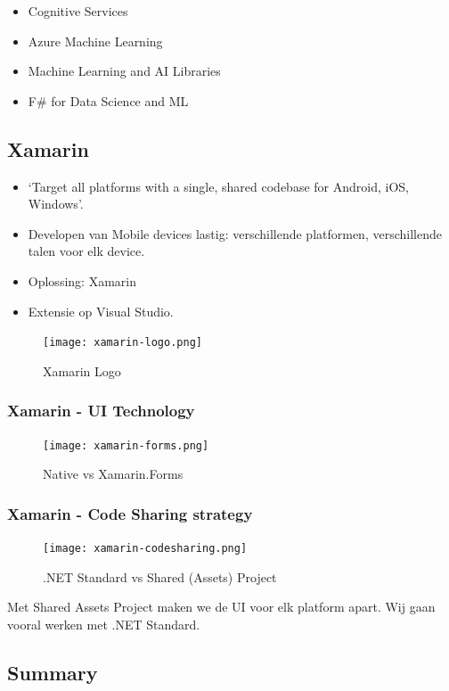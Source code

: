 \documentclass{article}
\begin{document}
\begin{itemize}
    \item Cognitive Services
    \item Azure Machine Learning
    \item Machine Learning and AI Libraries
    \item F\# for Data Science and ML
\end{itemize}

\subsection{Xamarin}
\begin{itemize}
    \item `Target all platforms with a single, shared codebase for Android, iOS, Windows'. 
    \item Developen van Mobile devices lastig: verschillende platformen, verschillende talen voor elk device.
    \item Oplossing: Xamarin
    \item Extensie op Visual Studio.
\end{itemize}


\begin{figure}[H]
    \centering
    \texttt{[image: xamarin-logo.png]}
    \caption{Xamarin Logo}
\end{figure}

\subsubsection{Xamarin - UI Technology}
\begin{figure}[H]
    \centering
    \texttt{[image: xamarin-forms.png]}
    \caption{Native vs Xamarin.Forms}
\end{figure}

\subsubsection{Xamarin - Code Sharing strategy}

\begin{figure}[H]
    \centering
    \texttt{[image: xamarin-codesharing.png]}
    \caption{.NET Standard vs Shared (Assets) Project}
\end{figure}

Met Shared Assets Project maken we de UI voor elk platform apart. Wij gaan vooral werken met .NET Standard.


\subsection{Summary}
\end{document}
